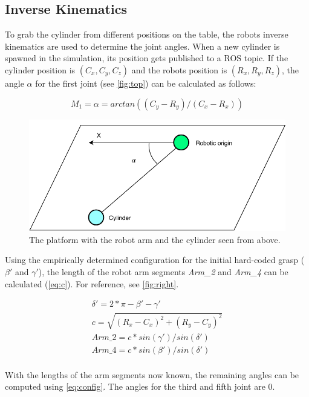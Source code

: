 \subsection{Inverse Kinematics}
To grab the cylinder from different positions on the table, the robots inverse kinematics are used to determine the joint angles.
When a new cylinder is spawned in the simulation, its position gets published to a ROS topic.
If the cylinder position is $(C_x, C_y, C_z)$ and the robots position is $(R_x, R_y, R_z)$, the angle $\alpha$ for the first joint (see \autoref{fig:top}) can be calculated as follows:

\begin{equation}
\label{simple_equation}
M_1=\alpha = arctan((C_y-R_y)/(C_x-R_x))
\end{equation}

\begin{figure}[htpb]
\centering
	\includegraphics[width=0.9\linewidth]{figures/top_view.pdf} 
	\caption{The platform with the robot arm and the cylinder seen from above.}
	\label{fig:top}
\end{figure}

Using the empirically determined configuration for the initial hard-coded grasp ($\beta'$ and $\gamma'$), the length of the robot arm segments \textit{Arm\_2} and \textit{Arm\_4} can be calculated (\autoref{eq:c}).
For reference, see \autoref{fig:right}.

\begin{equation}
\begin{aligned}
\delta'=2*\pi-\beta'-\gamma'\\
c=\sqrt{(R_x-C_x)^2+(R_y-C_y)^2}\\
\textit{Arm\_2}=c*sin(\gamma')/sin(\delta')\\
\textit{Arm\_4}=c*sin(\beta')/sin(\delta')\\
\label{eq:c}
\end{aligned}
\end{equation}

With the lengths of the arm segments now known, the remaining angles can be computed using \autoref{eq:config}.
The angles for the third and fifth joint are $0$.

